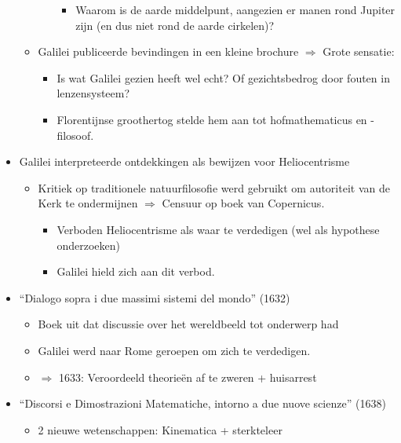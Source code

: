 \documentclass{article}
\begin{document}
\begin{itemize}
\begin{itemize}
\begin{itemize}
\begin{itemize}
            \item Waarom is de aarde middelpunt, aangezien er manen rond Jupiter zijn (en dus niet rond de aarde cirkelen)?
          \end{itemize}
        \end{itemize}
        \item Galilei publiceerde bevindingen in een kleine brochure $\Rightarrow$ Grote sensatie:
        \begin{itemize}
          \item Is wat Galilei gezien heeft wel echt? Of gezichtsbedrog door fouten in lenzensysteem?
          \item Florentijnse groothertog stelde hem aan tot hofmathematicus en -filosoof.
        \end{itemize}
      \end{itemize}
      \item Galilei interpreteerde ontdekkingen als bewijzen voor Heliocentrisme
      \begin{itemize}
        \item Kritiek op traditionele natuurfilosofie werd gebruikt om autoriteit van de Kerk te ondermijnen $\Rightarrow$ Censuur op boek van Copernicus.
        \begin{itemize}
          \item Verboden Heliocentrisme als waar te verdedigen (wel als hypothese onderzoeken)
          \item Galilei hield zich aan dit verbod.
        \end{itemize}
      \end{itemize}
      \item  ``Dialogo sopra i due massimi sistemi del mondo'' (1632)
      \begin{itemize}
        \item Boek uit dat discussie over het wereldbeeld tot onderwerp had
        \item Galilei werd naar Rome geroepen om zich te verdedigen.
        \item $\Rightarrow$ 1633: Veroordeeld theorie\"en af te zweren + huisarrest
      \end{itemize}
      \item ``Discorsi e Dimostrazioni Matematiche, intorno a due nuove scienze'' (1638)
      \begin{itemize}
        \item 2 nieuwe wetenschappen: Kinematica + sterkteleer
      \end{itemize}

\end{itemize}
\end{document}
